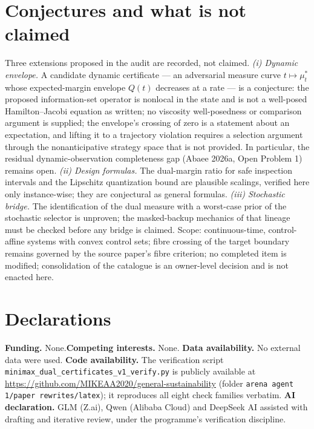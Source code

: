 \documentclass[10pt,twocolumn]{article}
\theoremstyle{definition}
\begin{document}
\section{Conjectures and what is not claimed}

Three extensions proposed in the audit are recorded, not claimed.
\emph{(i) Dynamic envelope.} A candidate dynamic certificate --- an
adversarial measure curve $t \mapsto \mu^{*}_{t}$ whose expected-margin
envelope $Q(t)$ decreases at a rate --- is a conjecture: the proposed
information-set operator is nonlocal in the state and is not a
well-posed Hamilton--Jacobi equation as written; no viscosity
well-posedness or comparison argument is supplied; the envelope's
crossing of zero is a statement about an expectation, and lifting it to a
trajectory violation requires a selection argument through the
nonanticipative strategy space that is not provided. In particular, the
residual dynamic-observation completeness gap (Abaee 2026a, Open
Problem 1) remains open. \emph{(ii) Design formulas.} The dual-margin
ratio for safe inspection intervals and the Lipschitz quantization bound
are plausible scalings, verified here only instance-wise; they are
conjectural as general formulas. \emph{(iii) Stochastic bridge.} The
identification of the dual measure with a worst-case prior of the
stochastic selector is unproven; the masked-backup mechanics of that
lineage must be checked before any bridge is claimed.
Scope: continuous-time, control-affine systems with convex control sets;
fibre crossing of the target boundary remains governed by the source
paper's fibre criterion; no completed item is modified; consolidation of
the catalogue is an owner-level decision and is not enacted here.

\section*{Declarations}
\textbf{Funding.} None.\quad \textbf{Competing interests.} None.\quad
\textbf{Data availability.} No external data were used.\quad
\textbf{Code availability.} The verification script
\texttt{minimax\_dual\_certificates\_v1\_verify.py} is publicly available
at \url{https://github.com/MIKEAA2020/general-sustainability} (folder
\texttt{arena agent 1/paper rewrites/latex}); it reproduces all eight
check families verbatim.\quad
\textbf{AI declaration.} GLM (Z.ai), Qwen (Alibaba Cloud) and DeepSeek AI
assisted with drafting and iterative review, under the programme's
verification discipline.
\end{document}
